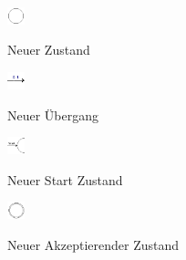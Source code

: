 \begin{figure}[h!]
  \begin{center}
    \begin{minipage}[t]{1cm}
      \includegraphics[width=0.5cm]{images/machineToolbar/state.png}
    \end{minipage}
    \begin{minipage}[t]{5cm}
      Neuer Zustand
    \end{minipage}
  \end{center}
\end{figure} 

\begin{figure}[h!]
  \begin{center}
    \begin{minipage}[t]{1cm}
      \includegraphics[width=0.5cm]{images/machineToolbar/transition.png}
    \end{minipage}
    \begin{minipage}[t]{5cm}
      Neuer Übergang
    \end{minipage}
  \end{center}
\end{figure} 

\begin{figure}[h!]
  \begin{center}
    \begin{minipage}[t]{1cm}
      \includegraphics[width=0.5cm]{images/machineToolbar/start.png}
    \end{minipage}
    \begin{minipage}[t]{5cm}
      Neuer Start Zustand
    \end{minipage}
  \end{center}
\end{figure}

\begin{figure}[h!]
  \begin{center}
    \begin{minipage}[t]{1cm}
      \includegraphics[width=0.5cm]{images/machineToolbar/final.png}
    \end{minipage}
    \begin{minipage}[t]{5cm}
      Neuer Akzeptierender Zustand
    \end{minipage}
  \end{center}
\end{figure} 


